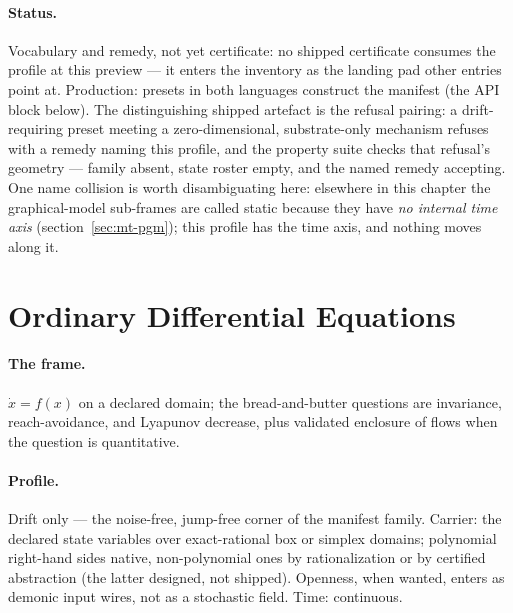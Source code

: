 \paragraph{Status.} Vocabulary and remedy, not yet certificate: no
shipped certificate consumes the profile at this preview --- it
enters the inventory as the landing pad other entries point at.
Production: presets in both languages construct the manifest (the
API block below). The distinguishing shipped artefact is the refusal
pairing: a drift-requiring preset meeting a zero-dimensional,
substrate-only mechanism refuses with a remedy naming this profile,
and the property suite checks that refusal's geometry --- family
absent, state roster empty, and the named remedy accepting. One name
collision is worth disambiguating here: elsewhere in this chapter the
graphical-model sub-frames are called static because they have
\emph{no internal time axis} (section~\ref{sec:mt-pgm}); this
profile has the time axis, and nothing moves along it.



\section{Ordinary Differential Equations}
\label{sec:mt-ode}

\paragraph{The frame.} $\dot x = f(x)$ on a declared domain; the
bread-and-butter questions are invariance, reach-avoidance, and
Lyapunov decrease, plus validated enclosure of flows when the
question is quantitative.

\paragraph{Profile.} Drift only --- the noise-free, jump-free corner
of the manifest family. Carrier: the declared state variables over
exact-rational box or simplex domains; polynomial right-hand sides
native, non-polynomial ones by rationalization or by certified
abstraction (the latter designed, not shipped). Openness, when wanted,
enters as demonic input wires, not as a stochastic field. Time:
continuous.

